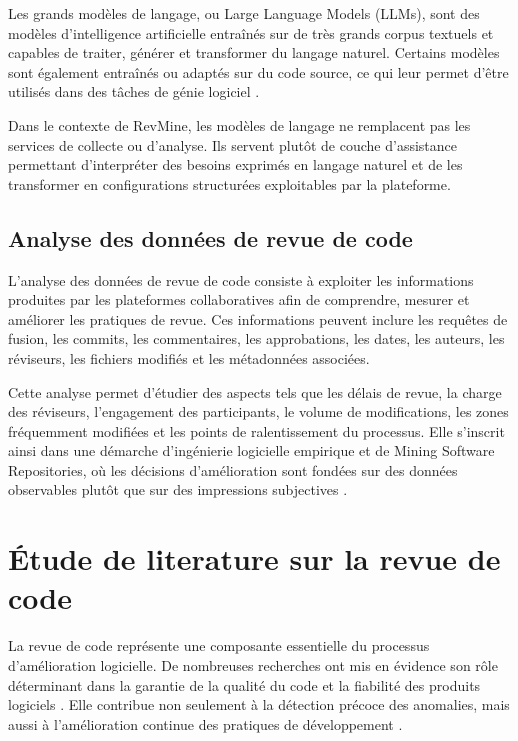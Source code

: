 Les grands modèles de langage, ou Large Language Models (LLMs), sont des modèles d’intelligence artificielle entraînés sur de très grands corpus textuels et capables de traiter, générer et transformer du langage naturel. Certains modèles sont également entraînés ou adaptés sur du code source, ce qui leur permet d’être utilisés dans des tâches de génie logiciel \cite{brown2020language,hou2024llmse}.

Dans le contexte de RevMine, les modèles de langage ne remplacent pas les services de collecte ou d’analyse. Ils servent plutôt de couche d’assistance permettant d’interpréter des besoins exprimés en langage naturel et de les transformer en configurations structurées exploitables par la plateforme.

\subsection{Analyse des données de revue de code}

L’analyse des données de revue de code consiste à exploiter les informations produites par les plateformes collaboratives afin de comprendre, mesurer et améliorer les pratiques de revue. Ces informations peuvent inclure les requêtes de fusion, les commits, les commentaires, les approbations, les dates, les auteurs, les réviseurs, les fichiers modifiés et les métadonnées associées.

Cette analyse permet d’étudier des aspects tels que les délais de revue, la charge des réviseurs, l’engagement des participants, le volume de modifications, les zones fréquemment modifiées et les points de ralentissement du processus. Elle s’inscrit ainsi dans une démarche d’ingénierie logicielle empirique et de Mining Software Repositories, où les décisions d’amélioration sont fondées sur des données observables plutôt que sur des impressions subjectives \cite{bacchelli2013expectations,gousios2014exploratory,vidoni2022systematic}.



\section{Étude de literature sur la revue de code}

La revue de code représente une composante essentielle du processus d’amélioration logicielle. De nombreuses recherches ont mis en évidence son rôle déterminant dans la garantie de la qualité du code et la fiabilité des produits logiciels \parencite{tufano2021towards, oh2005reflective}. Elle contribue non seulement à la détection précoce des anomalies, mais aussi à l’amélioration continue des pratiques de développement \parencite{mcintosh2014impact, bavota2015four}.

